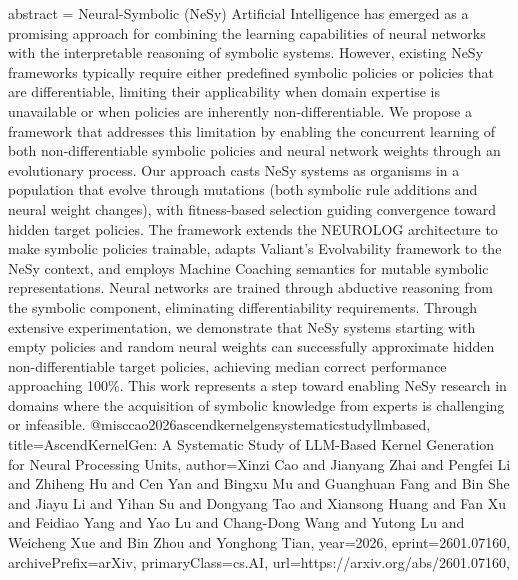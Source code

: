 {      abstract = {Neural-Symbolic (NeSy) Artificial Intelligence has emerged as a promising approach for combining the learning capabilities of neural networks with the interpretable reasoning of symbolic systems. However, existing NeSy frameworks typically require either predefined symbolic policies or policies that are differentiable, limiting their applicability when domain expertise is unavailable or when policies are inherently non-differentiable. We propose a framework that addresses this limitation by enabling the concurrent learning of both non-differentiable symbolic policies and neural network weights through an evolutionary process. Our approach casts NeSy systems as organisms in a population that evolve through mutations (both symbolic rule additions and neural weight changes), with fitness-based selection guiding convergence toward hidden target policies. The framework extends the NEUROLOG architecture to make symbolic policies trainable, adapts Valiant's Evolvability framework to the NeSy context, and employs Machine Coaching semantics for mutable symbolic representations. Neural networks are trained through abductive reasoning from the symbolic component, eliminating differentiability requirements. Through extensive experimentation, we demonstrate that NeSy systems starting with empty policies and random neural weights can successfully approximate hidden non-differentiable target policies, achieving median correct performance approaching 100\%. This work represents a step toward enabling NeSy research in domains where the acquisition of symbolic knowledge from experts is challenging or infeasible.}
}@misc{cao2026ascendkernelgensystematicstudyllmbased,
      title={AscendKernelGen: A Systematic Study of LLM-Based Kernel Generation for Neural Processing Units}, 
      author={Xinzi Cao and Jianyang Zhai and Pengfei Li and Zhiheng Hu and Cen Yan and Bingxu Mu and Guanghuan Fang and Bin She and Jiayu Li and Yihan Su and Dongyang Tao and Xiansong Huang and Fan Xu and Feidiao Yang and Yao Lu and Chang-Dong Wang and Yutong Lu and Weicheng Xue and Bin Zhou and Yonghong Tian},
      year={2026},
      eprint={2601.07160},
      archivePrefix={arXiv},
      primaryClass={cs.AI},
      url={https://arxiv.org/abs/2601.07160},
}
